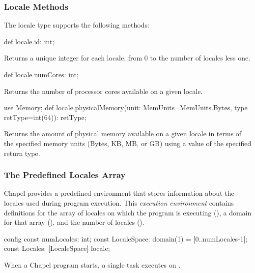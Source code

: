 \subsubsection{Locale Methods}
\label{Locale_Methods}

The locale type supports the following methods:

\begin{protohead}
def locale.id: int;
\end{protohead}
\begin{protobody}
Returns a unique integer for each locale, from 0 to the number of
locales less one.
\end{protobody}

\begin{protohead}
def locale.numCores: int;
\end{protohead}
\begin{protobody}
Returns the number of processor cores available on a given locale.
\end{protobody}

\begin{protohead}
use Memory;
def locale.physicalMemory(unit: MemUnits=MemUnits.Bytes, type retType=int(64)): retType;
\end{protohead}
\begin{protobody}
Returns the amount of physical memory available on a given locale in
terms of the specified memory units (Bytes, KB, MB, or GB) using a
value of the specified return type.
\end{protobody}

\subsubsection{The Predefined Locales Array}
\label{Predefined_Locales_Array}

Chapel provides a predefined environment that stores information about
the locales used during program execution.  This {\em execution
environment} contains definitions for the array of locales on which
the program is executing (), a domain for that array
(), and the number of locales ().
\begin{chapel}
config const numLocales: int;
const LocaleSpace: domain(1) = [0..numLocales-1];
const Locales: [LocaleSpace] locale;
\end{chapel}
When a Chapel program starts, a single task executes 
on .

